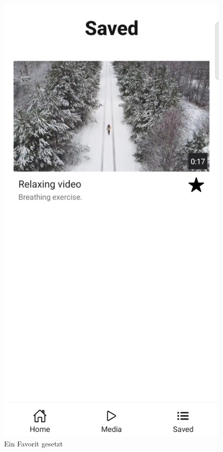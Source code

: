\begin{figure}[H]
\begin{minipage}{0.5\textwidth}
    \end{minipage}
    \begin{minipage}{0.5\textwidth}
        \centering
        \includegraphics[height=2\textwidth]{./pics/Favoriten.jpg}
        \caption{Ein Favorit gesetzt}
    \end{minipage}
\end{figure}

